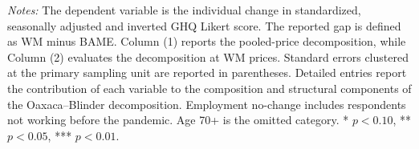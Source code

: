 \begin{landscape}
\vspace{-0.8em}
\noindent\parbox{0.95\linewidth}{\footnotesize \textit{Notes:} The dependent variable is the individual change in standardized, seasonally adjusted and inverted GHQ Likert score. The reported gap is defined as WM minus BAME. Column (1) reports the pooled-price decomposition, while Column (2) evaluates the decomposition at WM prices. Standard errors clustered at the primary sampling unit are reported in parentheses. Detailed entries report the contribution of each variable to the composition and structural components of the Oaxaca--Blinder decomposition. Employment no-change includes respondents not working before the pandemic. Age 70+ is the omitted category. * \(p<0.10\), ** \(p<0.05\), *** \(p<0.01\).}
\end{landscape}